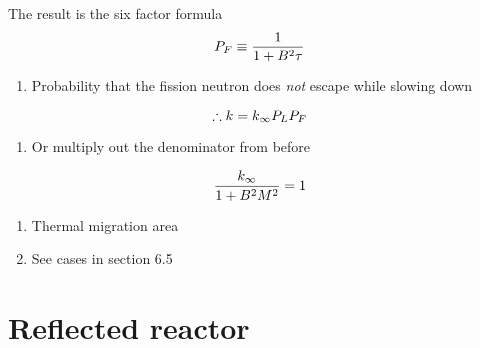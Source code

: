 \documentclass[aspectratio=1610,pdftex,dvipsnames,compress,xcolor={dvipsnames}]{beamer}
\begin{document}
\addtocounter{framenumber}{-1} 
\begin{frame}{The result is the six factor formula}
    \begin{equation}
        \LARGE
        P_F \equiv \frac{1}{1 + B^2 \tau}
    \end{equation}

    \vspace*{\fill}

    \begin{enumerate}[series=outerlist,topsep=0pt,itemsep=11pt,leftmargin=*,label=(\arabic*)]
        \item[]Probability that the fission neutron does \textit{not} escape while slowing down
    \end{enumerate}

    \vspace*{\fill}

    \begin{equation}
        \LARGE
        \therefore k = k_\infty P_L P_F
    \end{equation}

    \vspace*{\fill}

    \begin{enumerate}[series=outerlist,topsep=0pt,itemsep=11pt,leftmargin=*,label=(\arabic*)]
        \item[]Or multiply out the denominator from before
    \end{enumerate}

    \vspace*{\fill}

    \begin{equation}
        \LARGE
        \frac{k_\infty}{1 + B^2 M^2} = 1
    \end{equation}

    \vspace*{\fill}

    \begin{enumerate}[series=outerlist,topsep=0pt,itemsep=11pt,leftmargin=*,label=(\arabic*)]
        \item[]Thermal migration area
        \item[]See cases in section 6.5
    \end{enumerate}
\end{frame}


\section{Reflected reactor}
\end{document}
